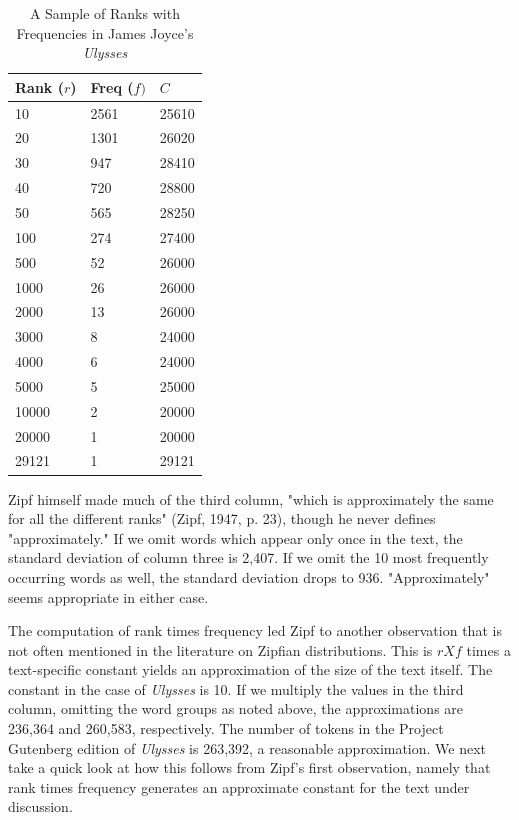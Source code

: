 \documentclass[12pt]{article}
\begin{document}
\begin{table}[H]
\begin{center}
 \begin{tabular}{||l l l|| }
 \hline
 Rank ($r$) &  Freq ($f)$ & $C$ \\
 \hline
    10 & 2561& 25610    \\
    20 & 1301 & 26020   \\
    30 & 947 & 28410    \\
    40 & 720 & 28800    \\
    50 & 565 & 28250    \\
    100 & 274 & 27400   \\
    500 & 52 & 26000    \\
    1000 & 26 & 26000   \\
    2000 & 13 & 26000   \\
    3000 & 8 & 24000    \\
    4000 & 6 & 24000    \\
    5000 & 5 & 25000    \\
    10000 & 2 & 20000   \\
    20000 & 1 & 20000   \\
    29121 & 1 & 29121   \\
  \hline
\end{tabular} 
\caption{A Sample of Ranks with Frequencies in James Joyce's \emph{Ulysses}}
\end{center}
\end{table}
Zipf himself made much of the third column, "which is approximately the same for all the different ranks" (Zipf, 1947, p. 23), though he never defines "approximately."  If we omit words which appear only once in the text, the standard deviation of column three is 2,407.   If we omit the 10 most frequently occurring words as well, the standard deviation drops to 936.  "Approximately" seems appropriate in either case. 

The computation of rank times frequency led Zipf to another observation that is not often mentioned in the literature on Zipfian distributions.  This is $r X f$ times a text-specific constant yields an approximation of the size of the text itself.   The constant in the case of \emph{Ulysses} is 10.  If we multiply the values in the third column, omitting the word groups as noted above, the approximations are 236,364 and 260,583, respectively.   The number of tokens in the Project Gutenberg edition of \emph{Ulysses} is 263,392, a reasonable approximation.   We next take a quick look at how this follows from Zipf's first observation, namely that rank times frequency generates an approximate constant for the text under discussion.
\end{document}
